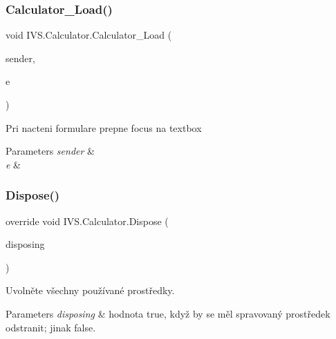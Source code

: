 \subsubsection{\texorpdfstring{Calculator\+\_\+\+Load()}{Calculator\_Load()}}
{\footnotesize\ttfamily void I\+V\+S.\+Calculator.\+Calculator\+\_\+\+Load (\begin{DoxyParamCaption}\item[{object}]{sender,  }\item[{Event\+Args}]{e }\end{DoxyParamCaption})\hspace{0.3cm}{\ttfamily [protected]}}



Pri nacteni formulare prepne focus na textbox 


\begin{DoxyParams}{Parameters}
{\em sender} & \\
\hline
{\em e} & \\
\hline
\end{DoxyParams}
\mbox{\label{class_i_v_s_1_1_calculator_aefacad0176c6b732e4fdd19829c3a37a}} 
\subsubsection{\texorpdfstring{Dispose()}{Dispose()}}
{\footnotesize\ttfamily override void I\+V\+S.\+Calculator.\+Dispose (\begin{DoxyParamCaption}\item[{bool}]{disposing }\end{DoxyParamCaption})\hspace{0.3cm}{\ttfamily [protected]}}



Uvolněte všechny používané prostředky. 


\begin{DoxyParams}{Parameters}
{\em disposing} & hodnota true, když by se měl spravovaný prostředek odstranit; jinak false.\\
\hline
\end{DoxyParams}
\mbox{\label{class_i_v_s_1_1_calculator_a6dab5899635143716cb5528ce502684d}} 
